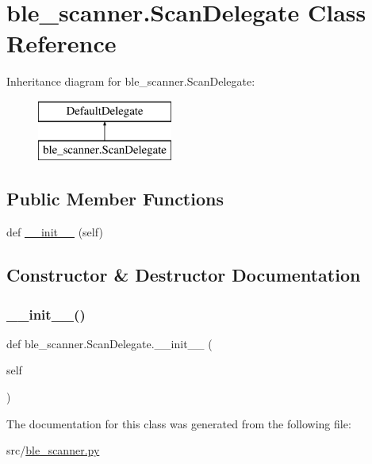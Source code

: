 \hypertarget{classble__scanner_1_1ScanDelegate}{}\section{ble\+\_\+scanner.\+Scan\+Delegate Class Reference}
\label{classble__scanner_1_1ScanDelegate}
Inheritance diagram for ble\+\_\+scanner.\+Scan\+Delegate\+:\begin{figure}[H]
\begin{center}
\leavevmode
\includegraphics[height=2.000000cm]{classble__scanner_1_1ScanDelegate}
\end{center}
\end{figure}
\subsection*{Public Member Functions}
\begin{DoxyCompactItemize}
\item 
def \hyperlink{classble__scanner_1_1ScanDelegate_ac4160baa68bca5a0dd30405a4a71fca9}{\+\_\+\+\_\+init\+\_\+\+\_\+} (self)
\end{DoxyCompactItemize}


\subsection{Constructor \& Destructor Documentation}
\mbox{\label{classble__scanner_1_1ScanDelegate_ac4160baa68bca5a0dd30405a4a71fca9}} 
\subsubsection{\texorpdfstring{\+\_\+\+\_\+init\+\_\+\+\_\+()}{\_\_init\_\_()}}
{\footnotesize\ttfamily def ble\+\_\+scanner.\+Scan\+Delegate.\+\_\+\+\_\+init\+\_\+\+\_\+ (\begin{DoxyParamCaption}\item[{}]{self }\end{DoxyParamCaption})}



The documentation for this class was generated from the following file\+:\begin{DoxyCompactItemize}
\item 
src/\hyperlink{ble__scanner_8py}{ble\+\_\+scanner.\+py}\end{DoxyCompactItemize}
